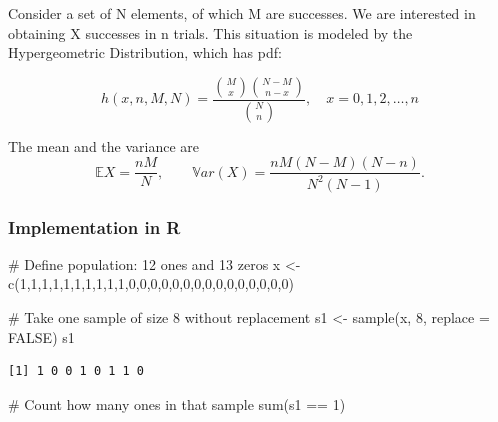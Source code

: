 \documentclass[
  letterpaper,
  DIV=11,
  numbers=noendperiod]{scrreprt}
\newenvironment{Shaded}{\begin{snugshade}}{\end{snugshade}}
\newcommand{\AttributeTok}[1]{\textcolor[rgb]{0.40,0.45,0.13}{#1}}
\newcommand{\CommentTok}[1]{\textcolor[rgb]{0.37,0.37,0.37}{#1}}
\newcommand{\ConstantTok}[1]{\textcolor[rgb]{0.56,0.35,0.01}{#1}}
\newcommand{\DecValTok}[1]{\textcolor[rgb]{0.68,0.00,0.00}{#1}}
\newcommand{\FunctionTok}[1]{\textcolor[rgb]{0.28,0.35,0.67}{#1}}
\newcommand{\NormalTok}[1]{\textcolor[rgb]{0.00,0.23,0.31}{#1}}
\newcommand{\OtherTok}[1]{\textcolor[rgb]{0.00,0.23,0.31}{#1}}
\newcommand{\SpecialCharTok}[1]{\textcolor[rgb]{0.37,0.37,0.37}{#1}}
\begin{document}
Consider a set of N elements, of which M are successes. We are
interested in obtaining X successes in n trials. This situation is
modeled by the Hypergeometric Distribution, which has pdf:

\[h(x,n,M,N) = \frac{\binom{M}{x}\binom{N-M}{n-x}}{\binom{N}{n}}, \quad x = 0,1,2,\ldots,n\]

The mean and the variance are \[\mathbb{E}X = \frac{nM}{N}, \qquad
\mathbb{V}ar(X) = \frac{nM(N-M)(N-n)}{N^2(N-1)}.\]

\subsubsection{Implementation in R}\label{implementation-in-r-3}

\begin{Shaded}
\begin{Highlighting}[]
\CommentTok{\# Define population: 12 ones and 13 zeros}
\NormalTok{x }\OtherTok{\textless{}{-}} \FunctionTok{c}\NormalTok{(}\DecValTok{1}\NormalTok{,}\DecValTok{1}\NormalTok{,}\DecValTok{1}\NormalTok{,}\DecValTok{1}\NormalTok{,}\DecValTok{1}\NormalTok{,}\DecValTok{1}\NormalTok{,}\DecValTok{1}\NormalTok{,}\DecValTok{1}\NormalTok{,}\DecValTok{1}\NormalTok{,}\DecValTok{1}\NormalTok{,}\DecValTok{0}\NormalTok{,}\DecValTok{0}\NormalTok{,}\DecValTok{0}\NormalTok{,}\DecValTok{0}\NormalTok{,}\DecValTok{0}\NormalTok{,}\DecValTok{0}\NormalTok{,}\DecValTok{0}\NormalTok{,}\DecValTok{0}\NormalTok{,}\DecValTok{0}\NormalTok{,}\DecValTok{0}\NormalTok{,}\DecValTok{0}\NormalTok{,}\DecValTok{0}\NormalTok{,}\DecValTok{0}\NormalTok{,}\DecValTok{0}\NormalTok{,}\DecValTok{0}\NormalTok{)}

\CommentTok{\# Take one sample of size 8 without replacement}
\NormalTok{s1 }\OtherTok{\textless{}{-}} \FunctionTok{sample}\NormalTok{(x, }\DecValTok{8}\NormalTok{, }\AttributeTok{replace =} \ConstantTok{FALSE}\NormalTok{)}
\NormalTok{s1}
\end{Highlighting}
\end{Shaded}

\begin{verbatim}
[1] 1 0 0 1 0 1 1 0
\end{verbatim}

\begin{Shaded}
\begin{Highlighting}[]
\CommentTok{\# Count how many ones in that sample}
\FunctionTok{sum}\NormalTok{(s1 }\SpecialCharTok{==} \DecValTok{1}\NormalTok{)}
\end{Highlighting}
\end{Shaded}
\end{document}
